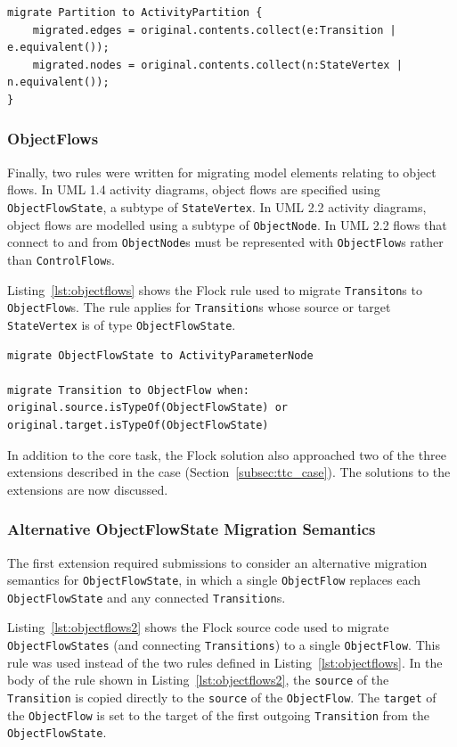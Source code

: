 \begin{lstlisting}[caption=Migrating Partitions, label=lst:partitions, language=Flock]
migrate Partition to ActivityPartition {
	migrated.edges = original.contents.collect(e:Transition | e.equivalent());
	migrated.nodes = original.contents.collect(n:StateVertex | n.equivalent());	
}
\end{lstlisting}


\subsubsection{ObjectFlows}
Finally, two rules were written for migrating model elements relating to object flows. In UML 1.4 activity diagrams, object flows are specified using \texttt{ObjectFlowState}, a subtype of \texttt{St\-at\-eVe\-rt\-ex}. In UML 2.2 activity diagrams, object flows are modelled using a subtype of \texttt{ObjectNode}. In UML 2.2 flows that connect to and from \texttt{ObjectNode}s must be represented with \texttt{ObjectFlow}s rather than \texttt{ControlFlow}s.

Listing~\ref{lst:objectflows} shows the Flock rule used to migrate \texttt{Transiton}s to \texttt{Ob\-je\-ctFl\-ow}s. The rule applies for \texttt{Transition}s whose source or target \texttt{St\-at\-eVe\-rt\-ex} is of type \texttt{Ob\-je\-ctFl\-owSt\-ate}.

\begin{lstlisting}[caption=Migrating ObjectFlows, label=lst:objectflows, language=Flock]
migrate ObjectFlowState to ActivityParameterNode

migrate Transition to ObjectFlow when: original.source.isTypeOf(ObjectFlowState) or original.target.isTypeOf(ObjectFlowState)
\end{lstlisting}

In addition to the core task, the Flock solution also approached two of the three extensions described in the case (Section~\ref{subsec:ttc_case}). The solutions to the extensions are now discussed.

\subsubsection{Alternative ObjectFlowState Migration Semantics}
The first extension required submissions to consider an alternative migration semantics for \texttt{ObjectFlowState}, in which a single \texttt{ObjectFlow} replaces each \texttt{ObjectFlowState} and any connected \texttt{Transition}s.

Listing~\ref{lst:objectflows2} shows the Flock source code used to migrate \texttt{ObjectFlowStates} (and connecting \texttt{Transitions}) to a single \texttt{ObjectFlow}. This rule was used instead of the two rules defined in Listing~\ref{lst:objectflows}. In the body of the rule shown in Listing~\ref{lst:objectflows2}, the \texttt{source} of the \texttt{Transition} is copied directly to the \texttt{source} of the \texttt{ObjectFlow}. The \texttt{target} of the \texttt{ObjectFlow} is set to the target of the first outgoing \texttt{Transition} from the \texttt{ObjectFlowState}. 

